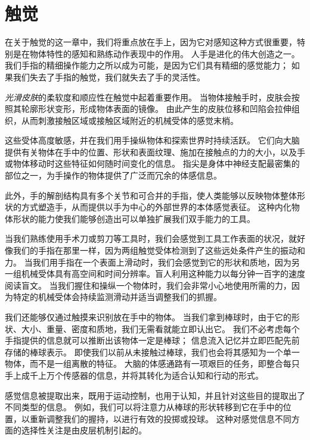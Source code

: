 \chapter{触觉} \label{chap:chap19}

在关于触觉的这一章中，我们将重点放在手上，因为它对感知这种方式很重要，特别是在物体特性的感知和熟练动作表现中的作用。
人手是进化的伟大创造之一。
我们手指的精细操作能力之所以成为可能，是因为它们具有精细的感觉能力；
如果我们失去了手指的触觉，我们就失去了手的灵活性。





\textit{光滑皮肤}的柔软度和顺应性在触觉中起着重要作用。
当物体接触手时，皮肤会按照其轮廓形状变形，形成物体表面的镜像。
由此产生的皮肤位移和凹陷会拉伸组织，从而刺激接触区域或接触区域附近的机械受体的感觉末梢。



这些受体高度敏感，并在我们用手操纵物体和探索世界时持续活跃。
它们向大脑提供有关物体在手中的位置、形状和表面纹理、施加在接触点的力的大小，以及手或物体移动时这些特征如何随时间变化的信息。
指尖是身体中神经支配最密集的部位之一，为手操作的物体提供了广泛而冗余的体感信息。


此外，手的解剖结构具有多个关节和可合并的手指，使人类能够以反映物体整体形状的方式塑造手，从而提供以手为中心的外部世界的本体感觉表征。
这种内化物体形状的能力使我们能够创造出可以单独扩展我们双手能力的工具。


当我们熟练使用手术刀或剪刀等工具时，我们会感觉到工具工作表面的状况，就好像我们的手指在那里一样，因为两组触觉受体检测到了这些远处条件产生的振动和力。
当我们用手指在一个表面上滑动时，我们会感觉到它的形状和质地，因为另一组机械受体具有高空间和时间分辨率。盲人利用这种能力以每分钟一百字的速度阅读盲文。
当我们握住和操纵一个物体时，我们会非常小心地使用所需的力，因为特定的机械受体会持续监测滑动并适当调整我们的抓握。


我们还能够仅通过触摸来识别放在手中的物体。
当我们拿到棒球时，由于它的形状、大小、重量、密度和质地，我们无需看就能立即认出它。
我们不必考虑每个手指提供的信息就可以推断出该物体一定是棒球；
信息流入记忆并立即匹配先前存储的棒球表示。
即使我们以前从未接触过棒球，我们也会将其感知为一个单一物体，而不是一组离散的特征。
大脑的体感通路有一项艰巨的任务，即整合每只手上成千上万个传感器的信息，并将其转化为适合认知和行动的形式。


感觉信息被提取出来，既用于运动控制，也用于认知，并且针对这些目的提取出了不同类型的信息。
例如，我们可以将注意力从棒球的形状转移到它在手中的位置，以重新调整我们的握持，以进行有效的投掷或投球。
这种对感觉信息不同方面的选择性关注是由皮层机制引起的。



